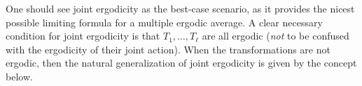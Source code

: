 \documentclass[11pt]{amsart}
\theoremstyle{definition}
\newtheorem{definition}[lemma]{Definition}
\DeclareMathOperator*{\E}{\mathbb{E}}
\newcommand{\N}{{\mathbb N}}
\newcommand{\R}{{\mathbb R}}
\newcommand{\CI}{{\mathcal I}}
\newcommand{\CX}{{\mathcal X}}
\newcommand{\norm}[1]{\left\Vert #1\right\Vert}
\newcommand{\1}{{\mathbf{1}}}
\newcommand{\floor}[1]{{\left \lfloor #1 \right \rfloor}}
\begin{document}
One should see joint ergodicity as the best-case scenario, as it provides the nicest possible limiting formula for a multiple ergodic average. A clear necessary condition for joint ergodicity is that $T_1, \ldots, T_\ell$ are all ergodic (\emph{not} to be confused with the ergodicity of their joint action). When the transformations are not ergodic, then the natural generalization of joint ergodicity is given by the concept below.
\end{document}
